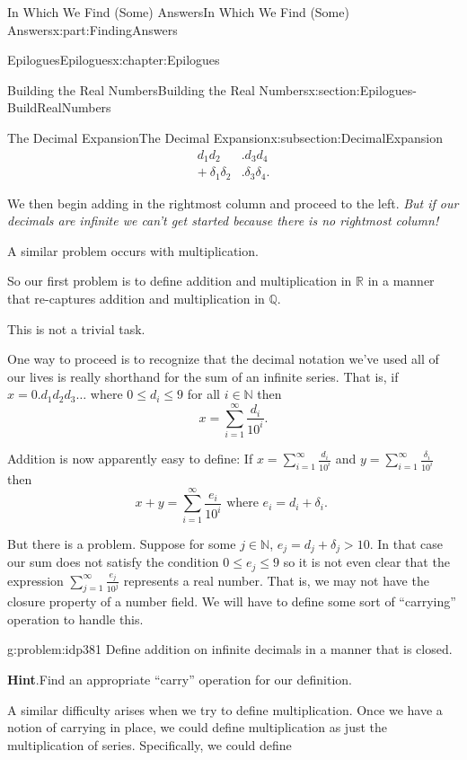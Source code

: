 \documentclass[oneside,10pt,]{book}
\newcommand{\blocktitlefont}{\relax}
\numberwithin{equation}{section}
\newcommand{\RR}{\mathbb {R}}
\newcommand{\QQ}{\mathbb {Q}}
\newcommand{\NN}{\mathbb {N}}
\newcommand{\amp}{&}
\begin{document}
\begin{partptx}{In Which We Find (Some) Answers}{}{In Which We Find (Some) Answers}{}{}{x:part:FindingAnswers}
\begin{chapterptx}{Epilogues}{}{Epilogues}{}{}{x:chapter:Epilogues}
\begin{sectionptx}{Building the Real Numbers}{}{Building the Real Numbers}{}{}{x:section:Epilogues-BuildRealNumbers}
\begin{subsectionptx}{The Decimal Expansion}{}{The Decimal Expansion}{}{}{x:subsection:DecimalExpansion}
\begin{align*}
d_1d_2\amp .d_3d_4\\
+\   \delta_1\delta_2\amp .\delta_3\delta_4\text{.}
\end{align*}
%
\par
We then begin adding in the rightmost column and proceed to the left. \emph{But if our decimals are infinite we can't get started because there is no rightmost column!}%
\par
A similar problem occurs with multiplication.%
\par
So our first problem is to define addition and multiplication in \(\RR\) in a manner that re-captures addition and multiplication in \(\QQ\).%
\par
This is not a trivial task.%
\par
One way to proceed is to recognize that the decimal notation we've used all of our lives is really shorthand for the sum of an infinite series. That is, if \(x=0.d_1d_2d_3\ldots\) where \(0\leq d_i\leq 9\) for all \(i\in\NN\) then%
\begin{equation*}
x=\sum_{i=1}^\infty\frac{d_i}{10^i}\text{.}
\end{equation*}
%
\par
Addition is now apparently easy to define: If \(x=\sum_{i=1}^\infty\frac{d_i}{10^i}\) and \(y=\sum_{i=1}^\infty\frac{\delta_i}{10^i}\) then%
\begin{equation*}
x+y= \sum_{i=1}^\infty\frac{e_i}{10^i} \text{ where \(e_i =d_i+\delta_i\). }
\end{equation*}
%
\par
But there is a problem. Suppose for some \(j\in\NN\), \(e_j=d_j+\delta_j>10\). In that case our sum does not satisfy the condition \(0\leq e_j\leq 9\) so it is not even clear that the expression \(\sum_{j=1}^\infty\frac{e_j}{10^j}\) represents a real number. That is, we may not have the closure property of a number field. We will have to define some sort of ``carrying'' operation to handle this.%
\begin{problem}{}{g:problem:idp381}%
Define addition on infinite decimals in a manner that is closed.%
\par\smallskip%
\noindent\textbf{\blocktitlefont Hint}.\hypertarget{g:hint:idp382}{}\quad{}Find an appropriate ``carry'' operation for our definition.%
\end{problem}
A similar difficulty arises when we try to define multiplication. Once we have a notion of carrying in place, we could define multiplication as just the multiplication of series. Specifically, we could define%

\end{subsectionptx}
\end{sectionptx}
\end{chapterptx}
\end{partptx}
\end{document}
